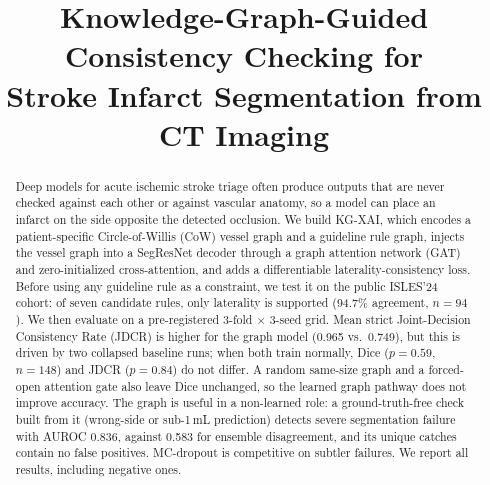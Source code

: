 \documentclass[conference]{IEEEtran}
\begin{document}
\title{Knowledge-Graph-Guided Consistency Checking for\\ Stroke Infarct Segmentation from CT Imaging}

\author{
\and
{}
}

\maketitle

\begin{abstract}
Deep models for acute ischemic stroke triage often produce outputs that are never checked against each other or against vascular anatomy, so a model can place an infarct on the side opposite the detected occlusion. We build KG-XAI, which encodes a patient-specific Circle-of-Willis (CoW) vessel graph and a guideline rule graph, injects the vessel graph into a SegResNet decoder through a graph attention network (GAT) and zero-initialized cross-attention, and adds a differentiable laterality-consistency loss. Before using any guideline rule as a constraint, we test it on the public ISLES'24 cohort: of seven candidate rules, only laterality is supported (94.7\% agreement, $n=94$). We then evaluate on a pre-registered 3-fold $\times$ 3-seed grid. Mean strict Joint-Decision Consistency Rate (JDCR) is higher for the graph model (0.965 vs.\ 0.749), but this is driven by two collapsed baseline runs; when both train normally, Dice ($p=0.59$, $n=148$) and JDCR ($p=0.84$) do not differ. A random same-size graph and a forced-open attention gate also leave Dice unchanged, so the learned graph pathway does not improve accuracy. The graph is useful in a non-learned role: a ground-truth-free check built from it (wrong-side or sub-1\,mL prediction) detects severe segmentation failure with AUROC 0.836, against 0.583 for ensemble disagreement, and its unique catches contain no false positives. MC-dropout is competitive on subtler failures. We report all results, including negative ones.
\end{abstract}
\end{document}
